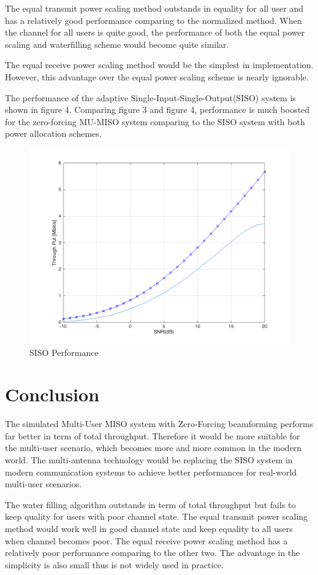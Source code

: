 \documentclass{article}
\begin{document}
\noindent
The equal transmit power scaling method outstands in equality for all user and has a relatively good performance comparing to the normalized method.
When the channel for all users is quite good, the performance of both the equal power scaling and waterfilling scheme would become quite similar.

\noindent
The equal receive power scaling method would be the simplest in implementation. However, this advantage over the equal power scaling scheme is nearly ignorable.

\noindent
The performance of the adaptive Single-Input-Single-Output(SISO) system is shown in figure 4. Comparing figure 3 and figure 4,
 performance is much boosted for the zero-forcing MU-MISO system comparing to the SISO system with both power allocation schemes.
\begin{figure}[ht]
\centering
\includegraphics[scale=0.4]{FadingSISO.png}
\caption{SISO Performance}
\label{fig:SISO}
\end{figure}


\section{Conclusion}
The simulated Multi-User MISO system with Zero-Forcing beamforming performs far better in term of total throughput. Therefore it would be
more suitable for the multi-user scenario, which becomes more and more common in the modern world.
The multi-antenna technology would be replacing the SISO system in modern communication systems to achieve better performances for
real-world multi-user scenarios.

\noindent
The water filling algorithm outstands in term of total throughput but fails to keep quality for users with poor channel state.
The equal transmit power scaling method would work well in good channel state and keep equality to all users when channel becomes poor.
The equal receive power scaling method has a relatively poor performance comparing to the other two. The advantage in the simplicity is also small thus is not widely used in practice.


{}
\end{document}
